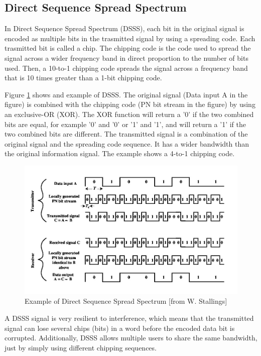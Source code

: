 \subsection{Direct Sequence Spread Spectrum}
	  		
In Direct Sequence Spread Spectrum 
(DSSS), each bit in the original signal is encoded as multiple
bits in the trasmitted signal by using a spreading code. Each trasmitted bit is called a chip. The chipping
code is the code used to spread the signal across a wider frequency band in direct proportion to the number
of bits used. Then, a 10-to-1 chipping code spreads the signal across a frequency band that is 10 times
greater than a 1-bit chipping code. 

Figure \ref{DSSS} shows and example of DSSS. The original signal
(Data input A in the figure) is combined with the chipping code (PN bit stream in the figure) by using
an exclusive-OR (XOR). The XOR function will return a '0' if the two combined bits are equal, for example
'0' and '0' or '1' and '1', and will return a '1' if the two combined bits are different. The transmitted signal
is a combination of the original signal and the spreading code sequence. It has a wider bandwidth
than the original information signal. The example shows a 4-to-1 chipping code.
	  		
\begin{figure}
\begin{center}
\includegraphics[width=15 cm]{DSSS.jpg}
\caption{Example of Direct Sequence Spread Spectrum [from W. Stallings]}\label{DSSS}
\end{center}
\end{figure}

A DSSS signal is very resilient to interference, which means that the transmitted signal can 
lose several chips (bits) in a word before the encoded data bit is corrupted. Additionally, DSSS allows
multiple users to share the same bandwidth, just by simply using different chipping sequences. 


